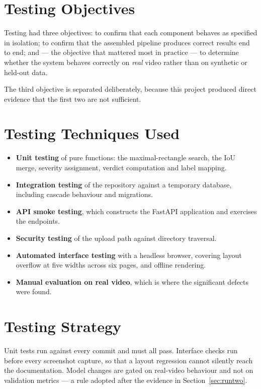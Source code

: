 \documentclass[
12pt,
a4paper,
oneside
]{report}
\begin{document}
\section{Testing Objectives}

Testing had three objectives: to confirm that each component behaves as
specified in isolation; to confirm that the assembled pipeline produces correct
results end to end; and --- the objective that mattered most in practice --- to
determine whether the system behaves correctly on \emph{real} video rather than
on synthetic or held-out data.

The third objective is separated deliberately, because this project produced
direct evidence that the first two are not sufficient.

\section{Testing Techniques Used}

\begin{itemize}[itemsep=3pt]
\item \textbf{Unit testing} of pure functions: the maximal-rectangle search, the
IoU merge, severity assignment, verdict computation and label mapping.
\item \textbf{Integration testing} of the repository against a temporary
database, including cascade behaviour and migrations.
\item \textbf{API smoke testing}, which constructs the FastAPI application and
exercises the endpoints.
\item \textbf{Security testing} of the upload path against directory traversal.
\item \textbf{Automated interface testing} with a headless browser, covering
layout overflow at five widths across six pages, and offline rendering.
\item \textbf{Manual evaluation on real video}, which is where the significant
defects were found.
\end{itemize}

\section{Testing Strategy}

Unit tests run against every commit and must all pass. Interface checks run
before every screenshot capture, so that a layout regression cannot silently
reach the documentation. Model changes are gated on real-video behaviour and not
on validation metrics --- a rule adopted after the evidence in
Section~\ref{sec:runtwo}.
\end{document}
